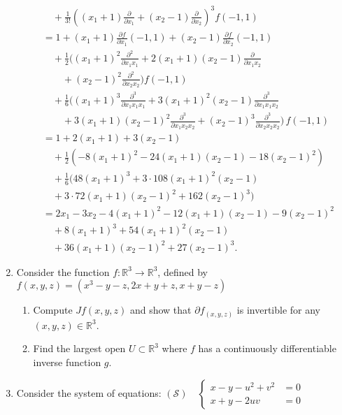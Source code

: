 \documentclass{article}
\begin{document}
\begin{enumerate}
\begin{align*}
        &\quad+\frac{1}{3!}\left( (x_1+1)\frac{\partial }{\partial x_1} +(x_2-1)\frac{\partial }{\partial x_2}  \right) ^{3}f(-1,1)\\
        &= 1+(x_1+1)\frac{\partial f}{\partial x_1}(-1,1) +(x_2-1)\frac{\partial f}{\partial x_2}(-1,1) \\
        &\quad+\frac{1}{2}\bigg( (x_1+1)^2\frac{\partial^2 }{\partial x_1x_1} +2 (x_1+1)(x_2-1)\frac{\partial }{\partial x_1x_2}\\
        &\quad\quad+(x_2-1)^2\frac{\partial^2 }{\partial x_2x_2} \bigg)f(-1,1)  \\
        &\quad+\frac{1}{6}\bigg( (x_1+1)^3\frac{\partial^3 }{\partial x_1x_1x_1}+3(x_1+1)^2(x_2-1) \frac{\partial^3 }{\partial x_1x_1x_2}  \\
        &\quad\quad +3(x_1+1)(x_2-1)^2 \frac{\partial^3 }{\partial x_1x_2x_2}+(x_2-1)^3\frac{\partial^3 }{\partial x_2x_2x_2}  \bigg)\, f(-1,1)\\
        &= 1+2(x_1+1)+3(x_2-1) \\
        &\quad+\frac{1}{2}\left( -8(x_1+1)^2 -24 (x_1+1)(x_2-1)-18(x_2-1)^2\right) \\
        &\quad+\frac{1}{6}\bigg( 48(x_1+1)^3+3\cdot 108(x_1+1)^2(x_2-1) \\&\quad+3\cdot 72(x_1+1)(x_2-1)^2 +162(x_2-1)^3 \bigg)\\
        &= 2x_1-3x_2 -4(x_1+1)^2 -12 (x_1+1)(x_2-1)-9(x_2-1)^2 \\
        &\quad+ 8(x_1+1)^3+54(x_1+1)^2(x_2-1) \\&\quad+36(x_1+1)(x_2-1)^2 +27(x_2-1)^3 
    .\end{align*}

\iffalse
\item Consider the function $f:\mathbb{R}^3\rightarrow \mathbb{R}^3$, defined by
$f(x,y,z) = (x^3-y-z, 2x+y+z, x+y-z)$

\begin{enumerate}[label= (\alph*)] 
\item Compute $Jf(x,y,z)$ and show that $\partial f_{(x,y,z)}$ is invertible for any $(x,y,z)\in\mathbb{R}^3$.

\item Find the largest open $U\subset \mathbb{R}^3$ where $f$ has a continuously differentiable inverse function $g$.
\end{enumerate}

\item Consider the system of equations:
$\left(\mathcal{S}\right) \quad 
\begin{cases}
x - y - u^2 + v^2 &= 0 \\
x + y - 2uv &= 0
\end{cases}$


\end{enumerate}
\end{document}
